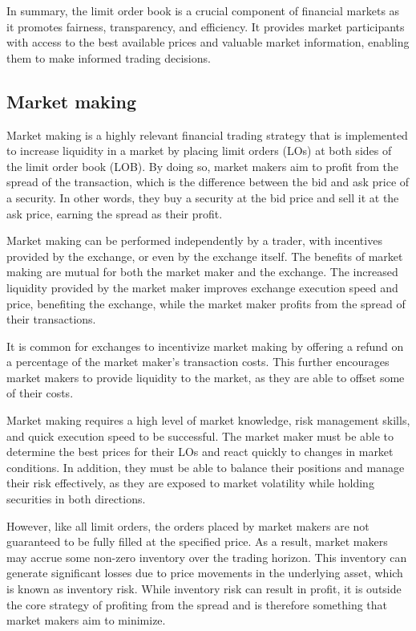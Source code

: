\documentclass[
  12pt,
  a4paper,
  DIV=11,
  numbers=noendperiod]{scrartcl}
\begin{document}
In summary, the limit order book is a crucial component of financial
markets as it promotes fairness, transparency, and efficiency. It
provides market participants with access to the best available prices
and valuable market information, enabling them to make informed trading
decisions.

\hypertarget{market-making}{%
\subsection{Market making}\label{market-making}}

Market making is a highly relevant financial trading strategy that is
implemented to increase liquidity in a market by placing limit orders
(LOs) at both sides of the limit order book (LOB). By doing so, market
makers aim to profit from the spread of the transaction, which is the
difference between the bid and ask price of a security. In other words,
they buy a security at the bid price and sell it at the ask price,
earning the spread as their profit.

Market making can be performed independently by a trader, with
incentives provided by the exchange, or even by the exchange itself. The
benefits of market making are mutual for both the market maker and the
exchange. The increased liquidity provided by the market maker improves
exchange execution speed and price, benefiting the exchange, while the
market maker profits from the spread of their transactions.

It is common for exchanges to incentivize market making by offering a
refund on a percentage of the market maker's transaction costs. This
further encourages market makers to provide liquidity to the market, as
they are able to offset some of their costs.

Market making requires a high level of market knowledge, risk management
skills, and quick execution speed to be successful. The market maker
must be able to determine the best prices for their LOs and react
quickly to changes in market conditions. In addition, they must be able
to balance their positions and manage their risk effectively, as they
are exposed to market volatility while holding securities in both
directions.

However, like all limit orders, the orders placed by market makers are
not guaranteed to be fully filled at the specified price. As a result,
market makers may accrue some non-zero inventory over the trading
horizon. This inventory can generate significant losses due to price
movements in the underlying asset, which is known as inventory risk.
While inventory risk can result in profit, it is outside the core
strategy of profiting from the spread and is therefore something that
market makers aim to minimize.
\end{document}
